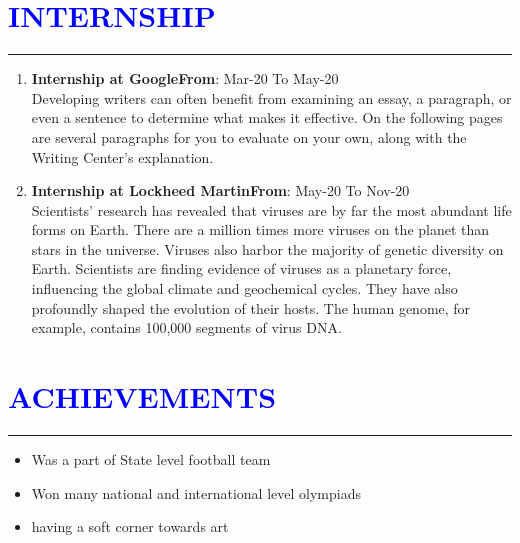 \documentclass{article}
\begin{document}
\section*{\large{\textcolor{blue}{\uppercase{Internship}}}}
\hrule
\vspace{3pt}
\begin{enumerate}
	\item {\textbf{Internship at Google}}\hfill {\textbf{From}}: Mar-20 To May-20\\
	Developing writers can often benefit from examining an essay, a paragraph, or even a sentence to determine what makes it effective. On the following pages are several paragraphs for you to evaluate on your own, along with the Writing Center's explanation.
	\item {\textbf{Internship at Lockheed Martin}}\hfill {\textbf{From}}: May-20 To Nov-20\\
	 Scientists' research has revealed that viruses are by far the most abundant life forms on Earth. There are a million times more viruses on the planet than stars in the universe. Viruses also harbor the majority of genetic diversity on Earth. Scientists are finding evidence of viruses as a planetary force, influencing the global climate and geochemical cycles. They have also profoundly shaped the evolution of their hosts. The human genome, for example, contains 100,000 segments of virus DNA.
\end{enumerate}

\vspace{3pt}

\section*{\large{\textcolor{blue}{\uppercase{achievements}}}}
\hrule
\vspace{3pt}
\begin{itemize}[noitemsep,nolistsep]
	\item Was a part of State level football team
	\item Won many national and international level olympiads
	\item having a soft corner towards art
\end{itemize}

\vspace{3pt}
\end{document}

